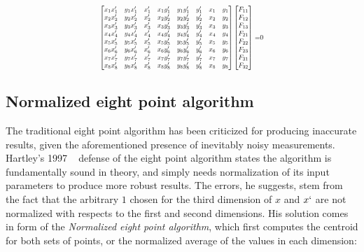 \documentclass[12pt]{article}
\begin{document}
\begin{align}\label{eq:expanded8Pt}
    \resizebox{0.5\textwidth}{!}{
        $\begin{bmatrix}
            x_1x_1' & y_1x_1' & x_1' & x_1y_1' & y_1y_1' & y_1' & x_1 & y_1\\
            x_2x_2' & y_2x_2' & x_2' & x_2y_2' & y_2y_2' & y_2' & x_2 & y_2\\
            x_3x_3' & y_3x_3' & x_3' & x_3y_3' & y_3y_3' & y_3' & x_3 & y_3\\
            x_4x_4' & y_4x_4' & x_4' & x_4y_4' & y_4y_4' & y_4' & x_4 & y_4\\
            x_5x_5' & y_5x_5' & x_5' & x_5y_5' & y_5y_5' & y_5' & x_5 & y_5\\
            x_6x_6' & y_6x_6' & x_6' & x_6y_6' & y_6y_6' & y_6' & x_6 & y_6\\
            x_7x_7' & y_7x_7' & x_7' & x_7y_7' & y_7y_7' & y_7' & x_7 & y_7\\
            x_8x_8' & y_8x_8' & x_8' & x_8y_8' & y_8y_8' & y_8' & x_8 & y_8
        \end{bmatrix}
        \begin{bmatrix}
            F_{11}\\F_{12}\\F_{13}\\F_{21}\\F_{22}\\F_{23}\\F_{31}\\F_{32}
        \end{bmatrix}$
        =0
    }
\end{align}

\subsection{Normalized eight point algorithm}

The traditional eight point algorithm has been criticized for producing inaccurate results, given the aforementioned presence of inevitably noisy measurements.  Hartley’s 1997 ~\cite{Hartley:1997:DEA:262631.262634} defense of the eight point algorithm states the algorithm is fundamentally sound in theory, and simply needs normalization of its input parameters to produce more robust results. The errors, he suggests, stem from the fact that the arbitrary $1$ chosen for the third dimension of $x$ and $x`$ are not normalized with respects to the first and second dimensions.
His solution comes in form of the \textit{Normalized eight point algorithm}, which first computes the centroid for both sets of points, or the normalized average of the values in each dimension:
\end{document}
